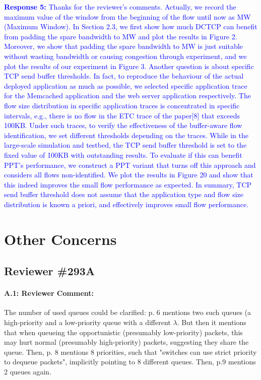 \documentclass[12pt,one-column]{article}
\begin{document}
\noindent\textcolor{blue}{\textbf{Response 5:}
Thanks for the reviewer’s comments. 
Actually, we record the maximum value of the window from the beginning of the flow until now as MW (Maximum Window).
In Section 2.3, we first show how much DCTCP can benefit from padding the spare bandwidth to MW and plot the results in Figure 2.
Moreover, we show that padding the spare bandwidth to MW is just suitable without wasting bandwidth or causing congestion through experiment, and we plot the results of our experiment in Figure 3.
Another question is about specific TCP send buffer thresholds.
In fact, to reproduce the behaviour of the actual deployed application as much as possible, we selected specific application trace for the Memcached application and the web server application respectively.
The flow size distribution in specific application traces is concentrated in specific intervals, e.g., there is no flow in the ETC trace of the paper[8] that exceeds 100KB.
Under such traces, to verify the effectiveness of the buffer-aware flow identification, we set different thresholds depending on the traces.
While in the large-scale simulation and testbed, the TCP send buffer threshold is set to the fixed value of 100KB with outstanding results.
To evaluate if this can benefit PPT’s performance, we construct a PPT variant that turns off this approach and considers all flows non-identified.
We plot the results in Figure 20 and show that this indeed improves the small flow performance as expected.
In summary, TCP send buffer threshold does not assume that the application type and flow size distribution is known a priori, and effectively improves small flow performance.
}
	
\section{Other Concerns}
\subsection{Reviewer \#293A}
{\it \paragraph{A.1: Reviewer Comment:} The number of used queues could be clarified: p. 6 mentions two such queues (a high-priority and a low-priority queue with a different $\lambda$. But then it mentions that when queueing the opportunistic (presumably low-priority) packets, this may hurt normal (presumably high-priority) packets, suggesting they share the queue. Then, p. 8 mentions 8 priorities, such that "switches can use strict priority to dequeue packets", implicitly pointing to 8 different queues. Then, p.9 mentions 2 queues again. }
\end{document}
